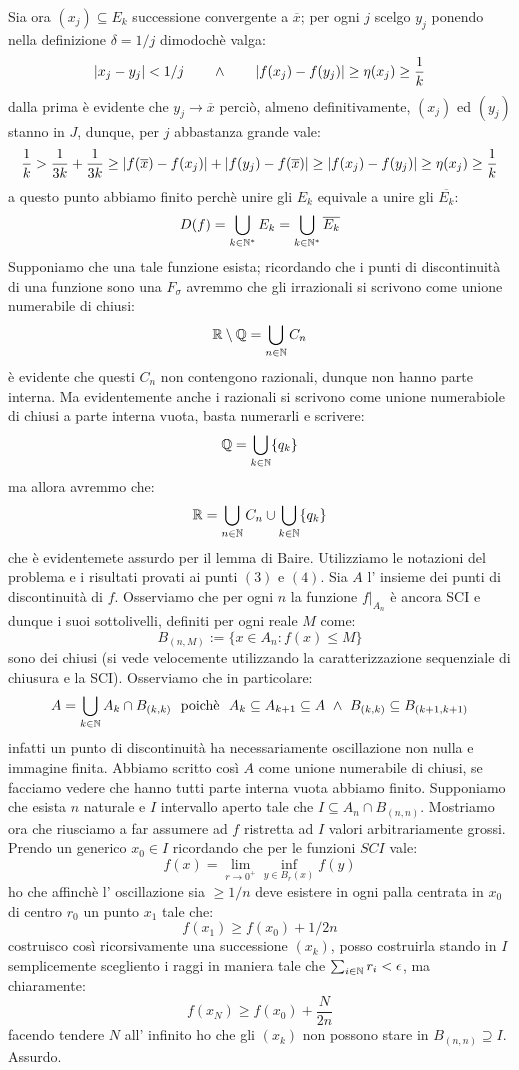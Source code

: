 Sia ora $(x_j)\subseteq E_k$ successione convergente a $\overline{x}$; per ogni $j$ scelgo $y_j$ ponendo nella definizione $\delta=1/j$ dimodochè valga:
$$
\vert{x_j-y_j}\vert<1/j\qquad \wedge \qquad \vert{f(x_j)-f(y_j)}\vert\geq \eta(x_j)\geq \frac{1}{k}
$$
dalla prima è evidente che $y_j\rightarrow \overline{x}$ perciò, almeno definitivamente, $(x_j)$ ed $(y_j)$ stanno in $J$, dunque, per $j$ abbastanza grande vale:
$$
\frac{1}{k}>\frac{1}{3k}+\frac{1}{3k}\geq \vert{f(\overline{x})-f(x_j)}\vert+\vert{f(y_j)-f(\overline{x})}\vert\geq \vert{f(x_j)-f(y_j)}\vert\geq \eta(x_j)\geq \frac{1}{k}
$$
a questo punto abbiamo finito perchè unire gli $E_k$ equivale a unire gli $\overline{E_k}$:
$$
D(f)=\bigcup_{k\in\mathbb{N}^{*}} E_k=\bigcup_{k\in\mathbb{N}^{*}} \overline{E_k}
$$
 Supponiamo che una tale funzione esista;  ricordando che i punti di discontinuità di una funzione sono una $F_\sigma$ avremmo che gli irrazionali si scrivono come unione numerabile di chiusi:
$$
\mathbb{R} \setminus \mathbb{Q}=\bigcup_{n\in\mathbb{N}} C_n
$$
è evidente che questi $C_n$ non contengono razionali, dunque non hanno parte interna. Ma evidentemente anche i razionali si scrivono come unione numerabiole di chiusi a parte interna vuota, basta numerarli e scrivere:
$$
\mathbb{Q}=\bigcup_{k\in\mathbb{N}} \{q_k\}
$$
ma allora avremmo che:
$$\mathbb{R}=\bigcup_{n\in\mathbb{N}} C_n \cup \bigcup_{k\in\mathbb{N}} \{q_k\}$$
che è evidentemete assurdo per il lemma di Baire.
 Utilizziamo le notazioni del problema  e i risultati provati ai punti $(3)$ e $(4)$. Sia $A$ l' insieme dei punti di discontinuità di $f$. Osserviamo che per ogni $n$ la funzione $f\vert _{A_n}$ è ancora SCI e dunque i suoi sottolivelli, definiti per ogni reale $M$ come:
$$B_{(n,M)}:=\{x\in A_n: f(x)\leq M\}$$ 
sono dei chiusi (si vede velocemente utilizzando la caratterizzazione sequenziale di chiusura e la SCI). Osserviamo che in particolare: 
$$ A=\bigcup_{k\in \mathbb{N}} A_k\cap B_{(k,k)}\ \mbox{ poichè }\ A_k\subseteq A_{k+1}\subseteq A\ \wedge\ B_{(k,k)}\subseteq B_{(k+1,k+1)} $$
infatti un punto di discontinuità ha necessariamente oscillazione non nulla e immagine finita. Abbiamo scritto così $A$ come unione numerabile di chiusi, se facciamo vedere che hanno tutti parte interna vuota abbiamo finito. Supponiamo che esista $n$ naturale e $I$ intervallo aperto tale che $I\subseteq A_n\cap B_{(n,n)}$. Mostriamo ora che riusciamo a far assumere ad $f$ ristretta ad $I$ valori arbitrariamente grossi. Prendo un generico $x_0\in I$ ricordando che per le funzioni $SCI$ vale:
$$ f(x)=\lim_{r\rightarrow 0^+} \inf_{y\in B_{r}(x)} f(y) $$ 
ho che affinchè l' oscillazione sia $\geq 1/n$ deve esistere in ogni palla centrata in $x_0$ di centro $r_0$ un punto $x_1$ tale che:
$$ f(x_1)\geq f(x_0)+1/2n $$
costruisco così ricorsivamente una successione $(x_k)$, posso costruirla stando in $I$ semplicemente scegliento i raggi in maniera tale che $\sum_{i\in \mathbb{N}} r_i<\epsilon$, ma chiaramente:
$$ f(x_N)\geq f(x_0)+\frac{N}{2n} $$
facendo tendere $N$ all' infinito ho che gli $(x_k)$ non possono stare in $B_{(n,n)}\supseteq I$. Assurdo.

